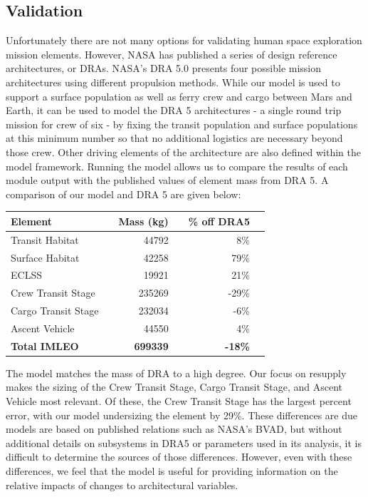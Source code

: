 \documentclass[]{aiaa-pretty}
\begin{document}
\subsection{Validation}
Unfortunately there are not many options for validating human space exploration mission elements. However, NASA has published a series of design reference architectures, or DRAs. NASA's DRA 5.0 presents four possible mission architectures using different propulsion methods. While our model is used to support a surface population as well as ferry crew and cargo between Mars and Earth, it can be used to model the DRA 5 architectures - a single round trip mission for crew of six - by fixing the transit population and surface populations at this minimum number so that no additional logistics are necessary beyond those crew.\cite{drake2010human} Other driving elements of the architecture are also defined within the model framework. Running the model allows us to compare the results of each module output with the published values of element mass from DRA 5. A comparison of our model and DRA 5 are given below:

\begin{center}
	\begin{tabular}{ lc rc rc}
		\textbf{Element} && \textbf{Mass (kg)} && \textbf{\% off DRA5} \\\hline
		Transit Habitat && 44792 && 8\% \\
		Surface Habitat && 42258 && 79\% \\
		ECLSS && 19921 && 21\% \\
		Crew Transit Stage && 235269 && -29\% \\
		Cargo Transit Stage && 232034 && -6\% \\
		Ascent Vehicle && 44550 && 4\% \\
		\textbf{Total IMLEO} && \textbf{699339} && \textbf{-18\%} \\
	\end{tabular}
\end{center}
The model matches the mass of DRA to a high degree. Our focus on resupply makes the sizing of the Crew Transit Stage, Cargo Transit Stage, and Ascent Vehicle most relevant. Of these, the Crew Transit Stage has the largest percent error, with our model undersizing the element by 29\%. These differences are due  models are based on published relations such as NASA's BVAD, but without additional details on subsystems in DRA5 or parameters used in its analysis, it is difficult to determine the sources of those differences. However, even with these differences, we feel that the model is useful for providing information on the relative impacts of changes to architectural variables. 
\end{document}
